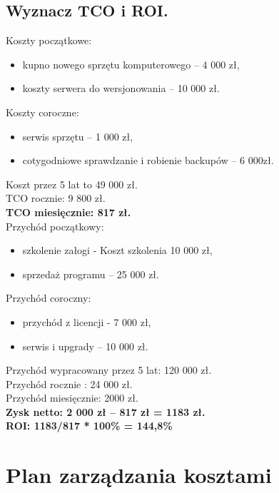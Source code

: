 \subsection*{Wyznacz TCO i ROI.}

Koszty początkowe:
\begin{itemize}

\item kupno nowego sprzętu komputerowego – 4 000 zł,
\item koszty serwera do wersjonowania – 10 000 zł.
\end{itemize}

Koszty coroczne:
\begin{itemize}

\item serwis sprzętu – 1 000 zł,
\item cotygodniowe sprawdzanie i robienie backupów – 6 000zł.
\end{itemize}

Koszt przez  5 lat to 49 000 zł.\\
TCO rocznie:  9 800 zł.\\
\textbf{TCO miesięcznie:  817 zł.}\\

Przychód początkowy:
\begin{itemize}
\item szkolenie załogi - Koszt szkolenia 10 000 zł,
\item sprzedaż programu – 25 000 zł.
\end{itemize}

Przychód coroczny:
\begin{itemize}
\item przychód  z licencji - 7 000 zł,
\item serwis i upgrady – 10 000 zł.
\end{itemize}

Przychód wypracowany przez 5 lat: 120 000 zł.\\
Przychód rocznie : 24 000 zł.\\
Przychód miesięcznie: 2000 zł.\\
\textbf{Zysk netto: 2 000 zł – 817 zł = 1183 zł.}\\
\textbf{ROI: 1183/817 * 100\% = 144,8\%} 


\section{Plan zarządzania kosztami}

